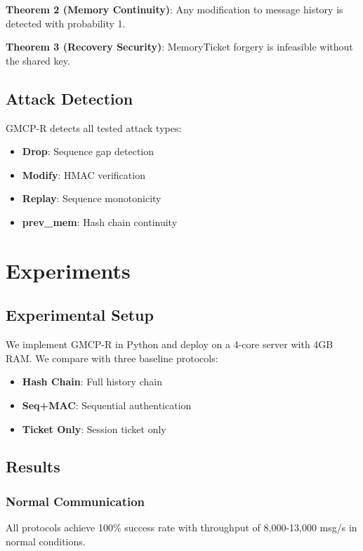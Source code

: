 \documentclass[conference]{IEEEtran}
\begin{document}
\textbf{Theorem 2 (Memory Continuity)}: Any modification to message history is detected with probability 1.

\textbf{Theorem 3 (Recovery Security)}: MemoryTicket forgery is infeasible without the shared key.

\subsection{Attack Detection}

GMCP-R detects all tested attack types:
\begin{itemize}
\item \textbf{Drop}: Sequence gap detection
\item \textbf{Modify}: HMAC verification
\item \textbf{Replay}: Sequence monotonicity
\item \textbf{prev\_mem}: Hash chain continuity
\end{itemize}

\section{Experiments}
\label{sec:experiments}

\subsection{Experimental Setup}

We implement GMCP-R in Python and deploy on a 4-core server with 4GB RAM. We compare with three baseline protocols:
\begin{itemize}
\item \textbf{Hash Chain}: Full history chain
\item \textbf{Seq+MAC}: Sequential authentication
\item \textbf{Ticket Only}: Session ticket only
\end{itemize}

\subsection{Results}

\subsubsection{Normal Communication}

All protocols achieve 100\% success rate with throughput of 8,000-13,000 msg/s in normal conditions.
\end{document}
